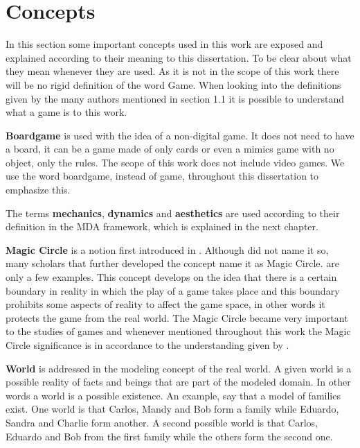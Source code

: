\section{Concepts}
In this section some important concepts used in this work are exposed and explained according  to their meaning to this dissertation. To be clear about what they mean whenever they are used. As it is not in the scope of this work there will be no rigid definition of the word Game. When looking into the definitions given by the many authors mentioned in section 1.1 it is possible to understand what a game is to this work. 

\textbf{Boardgame} is used with the idea of a non-digital game. It does not need to have a board, it can be a game made of only cards or even a mimics game with no object, only the rules. The scope of this work does not include video games. We use the word boardgame, instead of game, throughout this dissertation to emphasize this.

The terms \textbf{mechanics}, \textbf{dynamics} and \textbf{aesthetics} are used according to their definition in the MDA framework, which is explained in the next chapter. 

\textbf{Magic Circle} is a notion first introduced in \cite{huizinga2014homo}. Although \citeauthor{huizinga2014homo} did not name it so, many scholars that further developed the concept name it as Magic Circle. \cite{salen2004rules,bateman_implicit_2015} are only a few examples. This concept develops on the idea that there is a certain boundary in reality in which the play of a game takes place and this boundary prohibits some aspects of reality to affect the game space, in other words it protects the game from the real world. The Magic Circle became very important to the studies of games and whenever mentioned throughout this work the Magic Circle significance is in accordance to the understanding given by \cite{salen2004rules}.

\textbf{World} is addressed in the modeling concept of the real world. A given world is a possible reality of facts and beings that are part of the modeled domain. In other words a world is a possible existence. An example, say that a model of families exist. One world is that Carlos, Mandy and Bob form a family while Eduardo, Sandra and Charlie form another. A second possible world is that Carlos, Eduardo and Bob from the first family while the others form the second one. 

